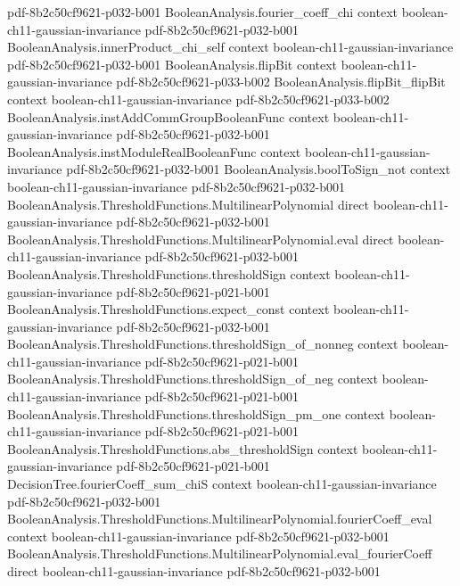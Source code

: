 \begin{theorem}
  {pdf-8b2c50cf9621-p032-b001}
\proofstep
  {BooleanAnalysis.fourier_coeff_chi}
  {context}
  {boolean-ch11-gaussian-invariance}
  {pdf-8b2c50cf9621-p032-b001}
\proofstep
  {BooleanAnalysis.innerProduct_chi_self}
  {context}
  {boolean-ch11-gaussian-invariance}
  {pdf-8b2c50cf9621-p032-b001}
\proofstep
  {BooleanAnalysis.flipBit}
  {context}
  {boolean-ch11-gaussian-invariance}
  {pdf-8b2c50cf9621-p033-b002}
\proofstep
  {BooleanAnalysis.flipBit_flipBit}
  {context}
  {boolean-ch11-gaussian-invariance}
  {pdf-8b2c50cf9621-p033-b002}
\proofstep
  {BooleanAnalysis.instAddCommGroupBooleanFunc}
  {context}
  {boolean-ch11-gaussian-invariance}
  {pdf-8b2c50cf9621-p032-b001}
\proofstep
  {BooleanAnalysis.instModuleRealBooleanFunc}
  {context}
  {boolean-ch11-gaussian-invariance}
  {pdf-8b2c50cf9621-p032-b001}
\proofstep
  {BooleanAnalysis.boolToSign_not}
  {context}
  {boolean-ch11-gaussian-invariance}
  {pdf-8b2c50cf9621-p032-b001}
\proofstep
  {BooleanAnalysis.ThresholdFunctions.MultilinearPolynomial}
  {direct}
  {boolean-ch11-gaussian-invariance}
  {pdf-8b2c50cf9621-p032-b001}
\proofstep
  {BooleanAnalysis.ThresholdFunctions.MultilinearPolynomial.eval}
  {direct}
  {boolean-ch11-gaussian-invariance}
  {pdf-8b2c50cf9621-p032-b001}
\proofstep
  {BooleanAnalysis.ThresholdFunctions.thresholdSign}
  {context}
  {boolean-ch11-gaussian-invariance}
  {pdf-8b2c50cf9621-p021-b001}
\proofstep
  {BooleanAnalysis.ThresholdFunctions.expect_const}
  {context}
  {boolean-ch11-gaussian-invariance}
  {pdf-8b2c50cf9621-p032-b001}
\proofstep
  {BooleanAnalysis.ThresholdFunctions.thresholdSign_of_nonneg}
  {context}
  {boolean-ch11-gaussian-invariance}
  {pdf-8b2c50cf9621-p021-b001}
\proofstep
  {BooleanAnalysis.ThresholdFunctions.thresholdSign_of_neg}
  {context}
  {boolean-ch11-gaussian-invariance}
  {pdf-8b2c50cf9621-p021-b001}
\proofstep
  {BooleanAnalysis.ThresholdFunctions.thresholdSign_pm_one}
  {context}
  {boolean-ch11-gaussian-invariance}
  {pdf-8b2c50cf9621-p021-b001}
\proofstep
  {BooleanAnalysis.ThresholdFunctions.abs_thresholdSign}
  {context}
  {boolean-ch11-gaussian-invariance}
  {pdf-8b2c50cf9621-p021-b001}
\proofstep
  {DecisionTree.fourierCoeff_sum_chiS}
  {context}
  {boolean-ch11-gaussian-invariance}
  {pdf-8b2c50cf9621-p032-b001}
\proofstep
  {BooleanAnalysis.ThresholdFunctions.MultilinearPolynomial.fourierCoeff_eval}
  {context}
  {boolean-ch11-gaussian-invariance}
  {pdf-8b2c50cf9621-p032-b001}
\proofstep
  {BooleanAnalysis.ThresholdFunctions.MultilinearPolynomial.eval_fourierCoeff}
  {direct}
  {boolean-ch11-gaussian-invariance}
  {pdf-8b2c50cf9621-p032-b001}

\end{theorem}
